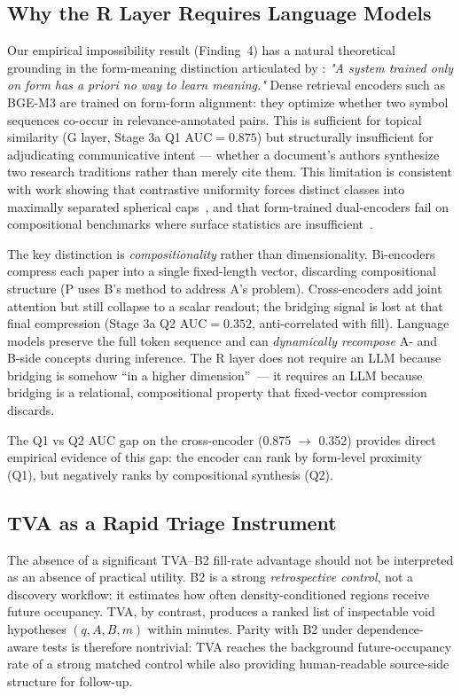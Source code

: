 \documentclass[11pt,twocolumn]{article}
\begin{document}
\subsection{Why the R Layer Requires Language Models}

Our empirical impossibility result (Finding~4) has a natural theoretical grounding
in the form-meaning distinction articulated by \cite{bender2020climbing}:
\emph{"A system trained only on form has a priori no way to learn meaning."}
Dense retrieval encoders such as BGE-M3 are trained on form-form alignment:
they optimize whether two symbol sequences co-occur in relevance-annotated pairs.
This is sufficient for topical similarity (G layer, Stage 3a Q1 AUC$=0.875$) but
structurally insufficient for adjudicating communicative intent --- whether a
document's authors synthesize two research traditions rather than merely cite them.
This limitation is consistent with work showing that contrastive uniformity forces
distinct classes into maximally separated spherical caps~\cite{wang2020understanding},
and that form-trained dual-encoders fail on compositional benchmarks where surface
statistics are insufficient~\cite{mccoy2019right}.

The key distinction is \emph{compositionality} \cite{fodor1988connectionism} rather
than dimensionality. Bi-encoders compress each paper into a single fixed-length vector,
discarding compositional structure (P uses B's method to address A's problem).
Cross-encoders add joint attention but still collapse to a scalar readout; the
bridging signal is lost at that final compression (Stage 3a Q2 AUC$=0.352$,
anti-correlated with fill). Language models preserve the full token sequence and can
\emph{dynamically recompose} A- and B-side concepts during inference.
The R layer does not require an LLM because bridging is somehow ``in a higher
dimension''~--- it requires an LLM because bridging is a relational, compositional
property that fixed-vector compression discards.

The Q1 vs Q2 AUC gap on the cross-encoder (0.875 $\to$ 0.352) provides direct
empirical evidence of this gap: the encoder can rank by form-level proximity
(Q1), but negatively ranks by compositional synthesis (Q2).

\subsection{TVA as a Rapid Triage Instrument}

The absence of a significant TVA--B2 fill-rate advantage should not be interpreted
as an absence of practical utility. B2 is a strong \emph{retrospective control}, not
a discovery workflow: it estimates how often density-conditioned regions receive future
occupancy. TVA, by contrast, produces a ranked list of inspectable void hypotheses
$(q,A,B,m)$ within minutes. Parity with B2 under dependence-aware tests is therefore
nontrivial: TVA reaches the background future-occupancy rate of a strong matched
control while also providing human-readable source-side structure for follow-up.
\end{document}
